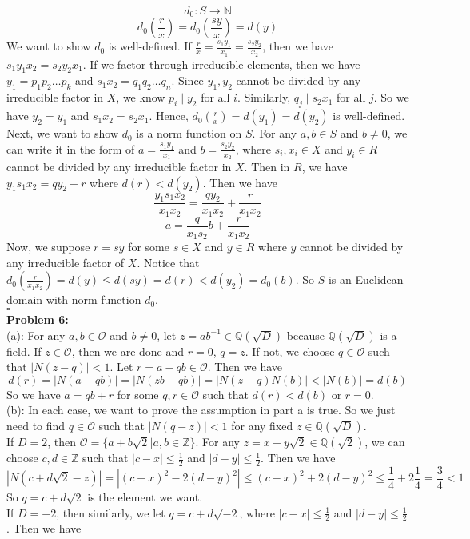\documentclass[12pt]{amsart}
\newcommand{\Q}{\mathbb{Q}}
\newcommand{\Z}{\mathbb{Z}}
\newcommand{\N}{\mathbb{N}}
\begin{document}
\[d_0:S\to \N\]
\[d_0(\frac{r}{x})=d_0(\frac{sy}{x})=d(y)\]
We want to show $d_0$ is well-defined. If $\frac{r}{x}=\frac{s_1y_1}{x_1}=\frac{s_2y_2}{x_2}$, then we have $s_1y_1x_2=s_2y_2x_1$. If we factor through irreducible elements, then we have $y_1=p_1p_2\dots p_k$ and $s_1x_2=q_1q_2\dots q_n$. Since $y_1,y_2$ cannot be divided by any irreducible factor in $X$, we know $p_i\mid y_2$ for all $i$. Similarly, $q_j\mid s_2x_1$ for all $j$. So we have $y_2=y_1$ and $s_1x_2=s_2x_1$. Hence, $d_0(\frac{r}{x})=d(y_1)=d(y_2)$ is well-defined.\\
Next, we want to show $d_0$ is a norm function on $S$. For any $a,b\in S$ and $b\neq 0$, we can write it in the form of $a=\frac{s_1y_1}{x_1}$ and $b=\frac{s_2y_2}{x_2}$, where $s_i,x_i\in X$ and $y_i\in R$ cannot be divided by any irreducible factor in $X$. Then in $R$, we have $y_1s_1x_2=qy_2+r$ where $d(r)<d(y_2)$. Then we have 
\[\frac{y_1s_1x_2}{x_1x_2}=\frac{qy_2}{x_1x_2}+\frac{r}{x_1x_2}\]
\[a=\frac{q}{x_1s_2}b+\frac{r}{x_1x_2}\]
Now, we suppose $r=sy$ for some $s\in X$ and $y\in R$ where $y$ cannot be divided by any irreducible factor of $X$.
Notice that $d_0(\frac{r}{x_1x_2})=d(y)\leq d(sy)=d(r)<d(y_2)=d_0(b)$. So $S$ is an Euclidean domain with norm function $d_0$.
\\\phantom{qed}\hfill$\square$\\
\textbf{Problem 6:}\\
(a): For any $a,b\in \mathcal{O}$ and $b\neq 0$, let $z=ab^{-1}\in \Q(\sqrt{D})$ because $\Q(\sqrt{D})$ is a field. If $z\in \mathcal{O}$, then we are done and $r=0$, $q=z$. If not, we choose $q\in\mathcal{O}$ such that $|N(z-q)|<1$. Let $r=a-qb\in \mathcal{O}$. Then we have 
\[d(r)=|N(a-qb)|=|N(zb-qb)|=|N(z-q)N(b)|<|N(b)|=d(b)\]
So we have $a=qb+r$ for some $q,r\in \mathcal{O}$ such that $d(r)<d(b)$ or $r=0$.\\
(b): In each case, we want to prove the assumption in part a is true. So we just need to find $q\in \mathcal{O}$ such that $|N(q-z)|<1$ for any fixed $z\in \Q(\sqrt{D})$.\\
If $D=2$, then $\mathcal{O}=\{a+b\sqrt{2}|a,b\in\Z\}$. For any $z=x+y\sqrt{2}\in \Q(\sqrt{2})$, we can choose $c,d\in\Z$ such that $|c-x|\leq \frac{1}{2}$ and $|d-y|\leq \frac{1}{2}$.
Then we have 
\[|N(c+d\sqrt{2}-z)|=|(c-x)^2-2(d-y)^2|\leq (c-x)^2+2(d-y)^2\leq \frac{1}{4}+2\frac{1}{4}=\frac{3}{4}<1\]
So $q=c+d\sqrt{2}$ is the element we want.\\
If $D=-2$, then similarly, we let $q=c+d\sqrt{-2}$, where $|c-x|\leq \frac{1}{2}$ and $|d-y|\leq \frac{1}{2}$. Then we have 
\end{document}

